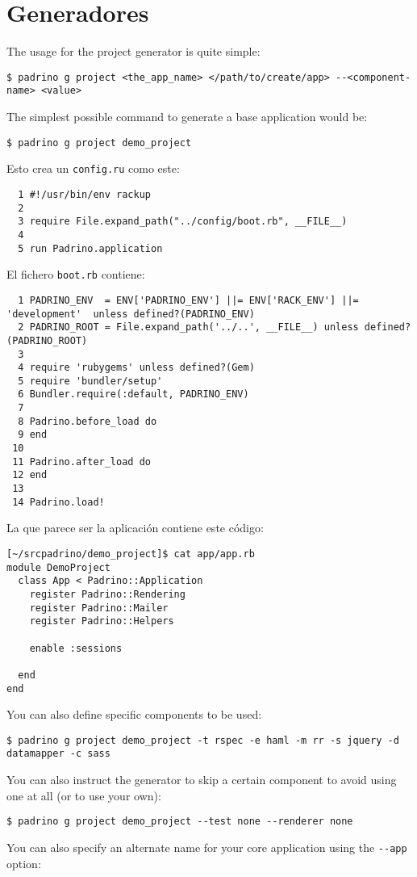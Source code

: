 \section{Generadores}

The usage for the project generator is quite simple:

\begin{verbatim}
$ padrino g project <the_app_name> </path/to/create/app> --<component-name> <value>
\end{verbatim}
The simplest possible command to generate a base application would be:

\begin{verbatim}
$ padrino g project demo_project
\end{verbatim}

Esto crea un \verb|config.ru| como este:
\begin{verbatim}
  1 #!/usr/bin/env rackup
  2 
  3 require File.expand_path("../config/boot.rb", __FILE__)
  4 
  5 run Padrino.application
\end{verbatim}
El fichero \verb|boot.rb| contiene:
\begin{verbatim}
  1 PADRINO_ENV  = ENV['PADRINO_ENV'] ||= ENV['RACK_ENV'] ||= 'development'  unless defined?(PADRINO_ENV)
  2 PADRINO_ROOT = File.expand_path('../..', __FILE__) unless defined?(PADRINO_ROOT)
  3 
  4 require 'rubygems' unless defined?(Gem)
  5 require 'bundler/setup'
  6 Bundler.require(:default, PADRINO_ENV)
  7 
  8 Padrino.before_load do
  9 end
 10 
 11 Padrino.after_load do
 12 end
 13 
 14 Padrino.load!
\end{verbatim}
La que parece ser la aplicación contiene este código:
\begin{verbatim}
[~/srcpadrino/demo_project]$ cat app/app.rb 
module DemoProject
  class App < Padrino::Application
    register Padrino::Rendering
    register Padrino::Mailer
    register Padrino::Helpers

    enable :sessions

  end
end
\end{verbatim}
You can also define specific components to be used:

\begin{verbatim}
$ padrino g project demo_project -t rspec -e haml -m rr -s jquery -d datamapper -c sass
\end{verbatim}
You can also instruct the generator to skip a certain component to avoid using one at all (or to use your own):

\begin{verbatim}
$ padrino g project demo_project --test none --renderer none
\end{verbatim}
You can also specify an alternate name for your core application using the \verb|--app| option:

